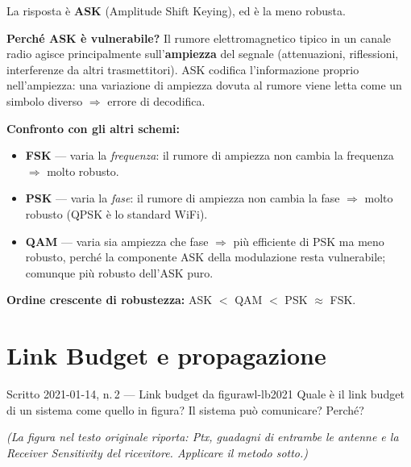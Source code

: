 \documentclass{report}
\begin{document}
\begin{solution}
La risposta è \textbf{ASK} (Amplitude Shift Keying), ed è la meno robusta.

\medskip
\textbf{Perché ASK è vulnerabile?}
Il rumore elettromagnetico tipico in un canale radio agisce principalmente
sull'\textbf{ampiezza} del segnale (attenuazioni, riflessioni, interferenze da
altri trasmettitori). ASK codifica l'informazione proprio nell'ampiezza: una
variazione di ampiezza dovuta al rumore viene letta come un simbolo diverso
$\Rightarrow$ errore di decodifica.

\medskip
\textbf{Confronto con gli altri schemi:}
\begin{itemize}
  \item \textbf{FSK} --- varia la \emph{frequenza}: il rumore di ampiezza non
        cambia la frequenza $\Rightarrow$ molto robusto.
  \item \textbf{PSK} --- varia la \emph{fase}: il rumore di ampiezza non
        cambia la fase $\Rightarrow$ molto robusto (QPSK è lo standard WiFi).
  \item \textbf{QAM} --- varia sia ampiezza che fase $\Rightarrow$ più efficiente
        di PSK ma meno robusto, perché la componente ASK della modulazione resta
        vulnerabile; comunque più robusto dell'ASK puro.
\end{itemize}

\textbf{Ordine crescente di robustezza:} ASK $<$ QAM $<$ PSK $\approx$ FSK.
\end{solution}

\section{Link Budget e propagazione}

\begin{Exercise}{Scritto 2021-01-14, n.\,2 --- Link budget da figura}{wl-lb2021}
Quale è il link budget di un sistema come quello in figura? Il sistema può
comunicare? Perché?

\medskip
\emph{(La figura nel testo originale riporta: Ptx, guadagni di entrambe le antenne
e la Receiver Sensitivity del ricevitore. Applicare il metodo sotto.)}
\end{Exercise}
\end{document}
